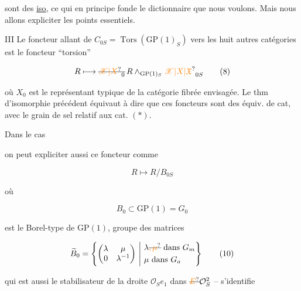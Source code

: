 sont des \uline{iso}, ce qui en principe fonde le dictionnaire que nous voulons. Mais nous allons  expliciter  les points essentiels.

III Le foncteur allant de $C_{0S}=\operatorname{Tors}(\mathrm{GP}(1)_S)$ vers les huit autres catégories est le foncteur ``torsion''

\[
R\longmapsto\deleted{\unsure{\mathscr X|X}_0}\,R\mathbin{\wedge}_{\mathrm{GP}(1)_S}\unsure{\mathscr X|X|\mathfrak X}_{0S}\tag*{(8)}
\]

où $X_0$ est le représentant typique  de la catégorie fibrée envisagée. Le thm d'isomorphie précédent équivaut à dire que ces foncteurs sont des équiv. de cat, avec le grain de sel  relatif aux cat. $(*)$.

Dans le cas


on peut expliciter aussi ce foncteur comme

\[
R\longmapsto R/B_{0S}\tag*{(9)}
\]

où

\[
B_0\subset \mathrm{GP}(1)=G_0\tag*{(10)}
\]

est le Borel-type de $\mathrm{GP}(1)$,    groupe des matrices

\[
\widetilde B_0=\left\{\begin{pmatrix}\lambda&\mu\\ 0&\lambda^{-1}\end{pmatrix}\ \middle|\ \begin{aligned}&\lambda\deleted{\unsure{,\mu}}\text{ dans }G_m\\&\mu\text{ dans }G_a\end{aligned}\right\}\tag*{(10)}
\]

 qui est aussi le stabilisateur de la droite $\mathcal O_S e_1$ dans $\deleted{\unsure{E}}\mathcal O_S^2$ -- s'identifie

